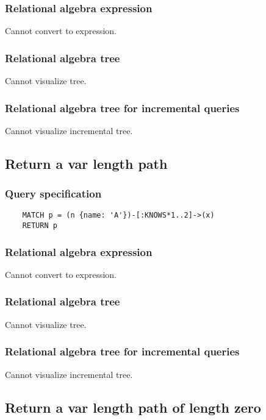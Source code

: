 	\subsubsection*{Relational algebra expression}

	Cannot convert to expression.

	\subsubsection*{Relational algebra tree}

	Cannot visualize tree.

	\subsubsection*{Relational algebra tree for incremental queries}

	Cannot visualize incremental tree.
	\subsection{Return a var length path}

	\subsubsection*{Query specification}

	\begin{lstlisting}
	MATCH p = (n {name: 'A'})-[:KNOWS*1..2]->(x)
	RETURN p
	\end{lstlisting}


	\subsubsection*{Relational algebra expression}

	Cannot convert to expression.

	\subsubsection*{Relational algebra tree}

	Cannot visualize tree.

	\subsubsection*{Relational algebra tree for incremental queries}

	Cannot visualize incremental tree.
	\subsection{Return a var length path of length zero}

